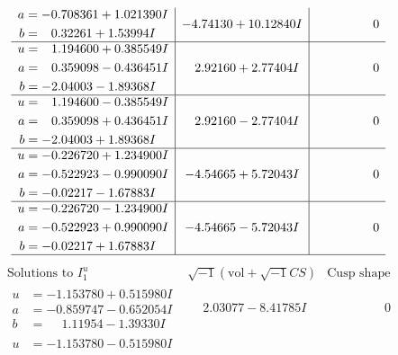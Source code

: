 \documentclass[1p]{elsarticle_modified}
\theoremstyle{definition}
\newcommand{\I}{\sqrt{-1}}
\begin{document}
$$\begin{array}{c|c|c}
\begin{aligned}
a &= -0.708361 + 1.021390 I \\
b &= \phantom{-}0.32261 + 1.53994 I\end{aligned}
 & -4.74130 + 10.12840 I & \phantom{-0.000000 } 0 \\ \hline\begin{aligned}
u &= \phantom{-}1.194600 + 0.385549 I \\
a &= \phantom{-}0.359098 - 0.436451 I \\
b &= -2.04003 - 1.89368 I\end{aligned}
 & \phantom{-}2.92160 + 2.77404 I & \phantom{-0.000000 } 0 \\ \hline\begin{aligned}
u &= \phantom{-}1.194600 - 0.385549 I \\
a &= \phantom{-}0.359098 + 0.436451 I \\
b &= -2.04003 + 1.89368 I\end{aligned}
 & \phantom{-}2.92160 - 2.77404 I & \phantom{-0.000000 } 0 \\ \hline\begin{aligned}
u &= -0.226720 + 1.234900 I \\
a &= -0.522923 - 0.990090 I \\
b &= -0.02217 - 1.67883 I\end{aligned}
 & -4.54665 + 5.72043 I & \phantom{-0.000000 } 0 \\ \hline\begin{aligned}
u &= -0.226720 - 1.234900 I \\
a &= -0.522923 + 0.990090 I \\
b &= -0.02217 + 1.67883 I\end{aligned}
 & -4.54665 - 5.72043 I & \phantom{-0.000000 } 0\\
 \hline 
 \end{array}$$\newpage$$\begin{array}{c|c|c}  
\text{Solutions to }I^u_{1}& \I (\text{vol} + \sqrt{-1}CS) & \text{Cusp shape}\\
 \hline 
\begin{aligned}
u &= -1.153780 + 0.515980 I \\
a &= -0.859747 - 0.652054 I \\
b &= \phantom{-}1.11954 - 1.39330 I\end{aligned}
 & \phantom{-}2.03077 - 8.41785 I & \phantom{-0.000000 } 0 \\ \hline\begin{aligned}
u &= -1.153780 - 0.515980 I \\

\end{aligned}
\end{array}$$
\end{document}

